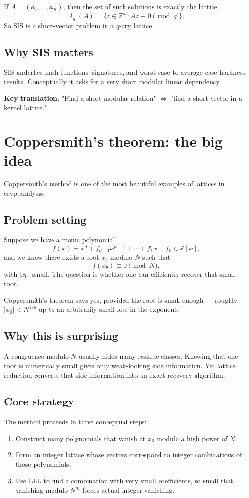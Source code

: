 \documentclass[11pt]{article}
\newenvironment{greenboxenv}{%
  \def\FrameCommand{\fboxrule=0.8pt \fboxsep=8pt \colorbox{greenbox}}%
  \MakeFramed{\advance\hsize-\width \FrameRestore}}{\endMakeFramed}
\newcommand{\Z}{\mathbb{Z}}
\begin{document}
If $A=(a_1,\dots,a_m)$, then the set of such solutions is exactly the lattice
\[
\Lambda_q^{\perp}(A)=\{z\in \Z^m : Az\equiv 0 \pmod q\}.
\]
So SIS is a short-vector problem in a $q$-ary lattice.

\subsection{Why SIS matters}
SIS underlies hash functions, signatures, and worst-case to average-case hardness results. Conceptually it asks for a very short modular linear dependency.

\begin{greenboxenv}
\textbf{Key translation.} "Find a short modular relation" $\Longleftrightarrow$ "find a short vector in a kernel lattice."
\end{greenboxenv}

\section{Coppersmith's theorem: the big idea}

Coppersmith's method is one of the most beautiful examples of lattices in cryptanalysis.

\subsection{Problem setting}
Suppose we have a monic polynomial
\[
f(x)=x^d+f_{d-1}x^{d-1}+\cdots+f_1x+f_0 \in \Z[x],
\]
and we know there exists a root $x_0$ modulo $N$ such that
\[
f(x_0)\equiv 0 \pmod N,
\]
with $|x_0|$ small. The question is whether one can efficiently recover that small root.

Coppersmith's theorem says yes, provided the root is small enough --- roughly $|x_0|<N^{1/d}$ up to an arbitrarily small loss in the exponent.

\subsection{Why this is surprising}
A congruence modulo $N$ usually hides many residue classes. Knowing that one root is numerically small gives only weak-looking side information. Yet lattice reduction converts that side information into an exact recovery algorithm.

\subsection{Core strategy}
The method proceeds in three conceptual steps:
\begin{enumerate}
    \item Construct many polynomials that vanish at $x_0$ modulo a high power of $N$.
    \item Form an integer lattice whose vectors correspond to integer combinations of those polynomials.
    \item Use LLL to find a combination with very small coefficients, so small that vanishing modulo $N^m$ forces actual integer vanishing.
\end{enumerate}
\end{document}
